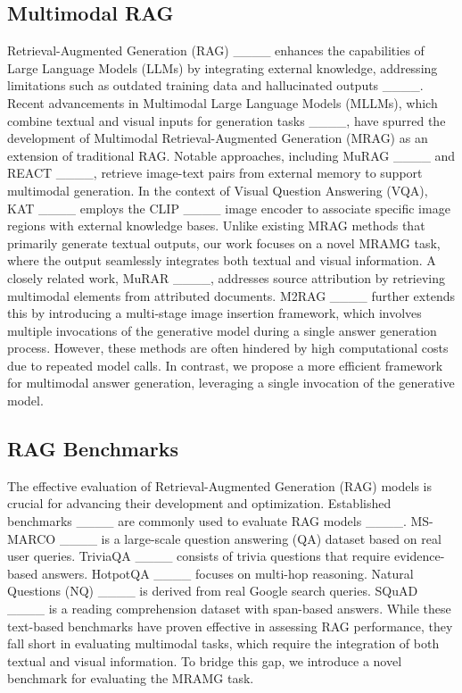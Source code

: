 \subsection{Multimodal RAG}
Retrieval-Augmented Generation (RAG) ____ enhances the capabilities of Large Language Models (LLMs) by integrating external knowledge, addressing limitations such as outdated training data and hallucinated outputs ____. Recent advancements in Multimodal Large Language Models (MLLMs), which combine textual and visual inputs for generation tasks ____, have spurred the development of Multimodal Retrieval-Augmented Generation (MRAG) as an extension of traditional RAG. Notable approaches, including MuRAG ____ and REACT ____, retrieve image-text pairs from external memory to support multimodal generation. In the context of Visual Question Answering (VQA), KAT ____ employs the CLIP ____ image encoder to associate specific image regions with external knowledge bases. Unlike existing MRAG methods that primarily generate textual outputs, our work focuses on a novel MRAMG task, where the output seamlessly integrates both textual and visual information. A closely related work, MuRAR ____, addresses source attribution by retrieving multimodal elements from attributed documents. M2RAG ____ further extends this by introducing a multi-stage image insertion framework, which involves multiple invocations of the generative model during a single answer generation process. However, these methods are often hindered by high computational costs due to repeated model calls. In contrast, we propose a more efficient framework for multimodal answer generation, leveraging a single invocation of the generative model.
\vspace{-2mm}
\subsection{RAG Benchmarks}
The effective evaluation of Retrieval-Augmented Generation (RAG) models is crucial for advancing their development and optimization. 
Established benchmarks ____ are commonly used to evaluate RAG models ____. MS-MARCO ____ is a large-scale question answering (QA) dataset based on real user queries. TriviaQA ____ consists of trivia questions that require evidence-based answers. HotpotQA ____ focuses on multi-hop reasoning. Natural Questions (NQ) ____ is derived from real Google search queries. SQuAD ____ is a reading comprehension dataset with span-based answers.
While these text-based benchmarks have proven effective in assessing RAG performance, they fall short in evaluating multimodal tasks, which require the integration of both textual and visual information. 
To bridge this gap, we introduce a novel benchmark for evaluating the MRAMG task.
